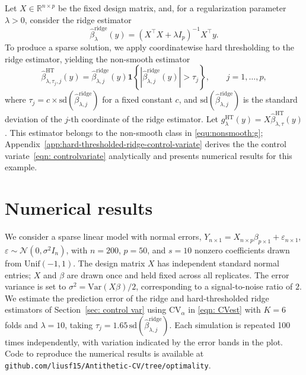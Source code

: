 \documentclass[12pt]{article}
\def\calN{\mathcal{N}}
\newcommand{\tran}{^\intercal}
\newcommand{\ep}{\varepsilon}
\newcommand{\Indc}[1]{{\mathbf{1}\left\{{#1}\right\}}}
\theoremstyle{general}
\newcommand{\cv}{{\mathrm{CV}}}
\begin{document}
 \quad 
Let $X\in\mathbb R^{n\times p}$ be the fixed design matrix, and, for a regularization parameter $\lambda>0$, consider the ridge estimator
\begin{equation*}
\widehat\beta^{\mathrm{ridge}}_{\lambda}(y)= (X\tran X+\lambda I_p)^{-1}X\tran y.
\end{equation*}
To produce a sparse solution, we apply coordinatewise hard thresholding to the ridge estimator, yielding the non-smooth estimator
\begin{equation*}
\widehat\beta^{\mathrm{HT}}_{\lambda,\tau_j,j}(y)=\widehat\beta^{\mathrm{ridge}}_{\lambda,j}(y)
\Indc{
\left|\widehat\beta^{\mathrm{ridge}}_{\lambda,j}(y)\right|>\tau_j
},
\qquad j=1,\ldots,p,
\end{equation*}
where $\tau_j = c \times \mathrm{sd}(\widehat\beta^{\mathrm{ridge}}_{\lambda, j})$ for a fixed constant $c$, and $\mathrm{sd}(\widehat\beta^{\mathrm{ridge}}_{\lambda, j})$ is the standard deviation of the $j$-th coordinate of the ridge estimator.
Let $g^{\mathrm{HT}}_{\lambda}(y)=X\widehat\beta^{\mathrm{HT}}_{\lambda,\tau}(y)$.
This estimator belongs to the non-smooth class in
\eqref{equ:nonsmooth:g}; Appendix~\ref{app:hard-thresholded-ridge-control-variate} derives the the control variate~\eqref{eqn: controlvariate} analytically and  presents numerical results for this example.



\section{Numerical results}
\label{sec: numerical}

We consider a sparse linear model with normal errors,
$Y_{n\times1}=X_{n\times p}\beta_{p\times1}+\ep_{n\times1}$, $\ep\sim\calN(0,\sigma^2I_n)$,
with $n=200$, $p=50$, and $s=10$ nonzero coefficients drawn from $\mathrm{Unif}(-1,1)$.
The design matrix $X$ has independent standard normal entries; $X$ and $\beta$ are drawn once and held fixed across all replicates.
The error variance is set to $\sigma^2=\mathrm{Var}(X\beta)/2$, corresponding to a signal-to-noise ratio of $2$.
We estimate the prediction error of the ridge and hard-thresholded ridge estimators of Section~\ref{sec: control var} using $\cv_\alpha$ in \eqref{eqn: CVest} with $K=6$ folds and $\lambda=10$, taking $\tau_j=1.65\,\mathrm{sd}(\widehat\beta^{\mathrm{ridge}}_{\lambda,j})$.
Each simulation is repeated 100 times independently, with variation indicated by the error bands in the plot.
Code to reproduce the numerical results is available at \texttt{github.com/liusf15/Antithetic-CV/tree/optimality}.
\end{document}
